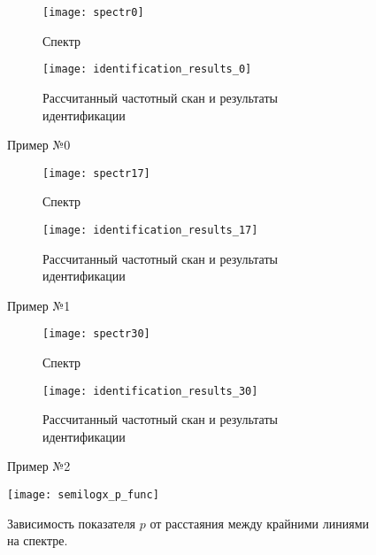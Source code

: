 	\begin{figure}[h!]
		\centering
		\begin{subfigure}[c]{0.4\textwidth}
			\texttt{[image: spectr0]}
			\caption{Спектр}
			\label{pic:results_0_spectr}
		\end{subfigure}
		\begin{subfigure}[c]{0.55\textwidth}
			\texttt{[image: identification\_results\_0]}
			\caption{Рассчитанный частотный скан и результаты идентификации}
			\label{pic:results_0_scan}
		\end{subfigure}
		\caption{Пример №0}
		\label{pic:result_0}
	\end{figure}

	\begin{figure}[h!]
		\centering
		\begin{subfigure}[c]{0.4\textwidth}
			\texttt{[image: spectr17]}
			\caption{Спектр}
			\label{pic:results_1_spectr}
		\end{subfigure}
		\begin{subfigure}[c]{0.55\textwidth}
			\texttt{[image: identification\_results\_17]}
			\caption{Рассчитанный частотный скан и результаты идентификации}
			\label{pic:results_1_scan}
		\end{subfigure}
		\caption{Пример №1}
		\label{pic:result_1}
	\end{figure}

	\begin{figure}[h!]
		\centering
		\begin{subfigure}[c]{0.4\textwidth}
			\texttt{[image: spectr30]}
			\caption{Спектр}
			\label{pic:results_2_spectr}
		\end{subfigure}
		\begin{subfigure}[c]{0.55\textwidth}
			\texttt{[image: identification\_results\_30]}
			\caption{Рассчитанный частотный скан и результаты идентификации}
			\label{pic:results_2_scan}
		\end{subfigure}
		\caption{Пример №2}
		\label{pic:result_2}
	\end{figure}

	\begin{figure}[h!]
		\centering
		\texttt{[image: semilogx\_p\_func]}
		\caption{Зависимость показателя $p$ от расстаяния между крайними
		линиями на спектре.}
		\label{pic:p_delta_tau}
	\end{figure}